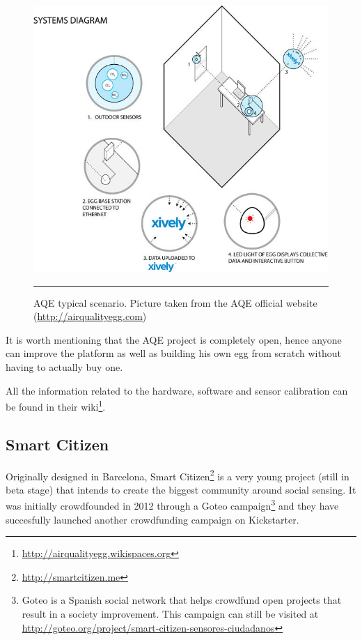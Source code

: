 \begin{figure}[htbp]
    \centering
    \includegraphics[scale=0.62]{./Figures/egg.jpg}
        \rule{35em}{0.5pt}
        \caption[Air Quality Egg typical scenario]{AQE typical scenario. Picture taken from the AQE official website (\url{http://airqualityegg.com})}
    \label{fig:aqe}
\end{figure}

It is worth mentioning that the AQE project is completely open, hence anyone can improve the platform as well as building his own egg from scratch without having to actually buy one.

All the information related to the hardware, software and sensor calibration can be found in their wiki\footnote{\url{http://airqualityegg.wikispaces.org}}.

\subsection{Smart Citizen}

Originally designed in Barcelona, Smart Citizen\footnote{\url{http://smartcitizen.me}} is a very young project (still in beta stage) that intends to create the biggest community around social sensing. It was initially crowdfounded in 2012 through a Goteo campaign\footnote{Goteo is a Spanish social network that helps crowdfund open projects that result in a society improvement. This campaign can still be visited at \url{http://goteo.org/project/smart-citizen-sensores-ciudadanos}} and they have succesfully launched another crowdfunding campaign on Kickstarter.

